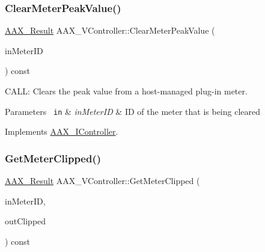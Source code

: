 \subsubsection{\texorpdfstring{ClearMeterPeakValue()}{ClearMeterPeakValue()}}
{\footnotesize\ttfamily \mbox{\hyperlink{a00392_a4d8f69a697df7f70c3a8e9b8ee130d2f}{A\+A\+X\+\_\+\+Result}} A\+A\+X\+\_\+\+V\+Controller\+::\+Clear\+Meter\+Peak\+Value (\begin{DoxyParamCaption}\item[{\mbox{\hyperlink{a00392_ac678f9c1fbcc26315d209f71a147a175}{A\+A\+X\+\_\+\+C\+Type\+ID}}}]{in\+Meter\+ID }\end{DoxyParamCaption}) const\hspace{0.3cm}{\ttfamily [virtual]}}



C\+A\+LL\+: Clears the peak value from a host-\/managed plug-\/in meter. 


\begin{DoxyParams}[1]{Parameters}
\mbox{\texttt{ in}}  & {\em in\+Meter\+ID} & ID of the meter that is being cleared \\
\hline
\end{DoxyParams}


Implements \mbox{\hyperlink{a01789_aa8fe057d2f53109e75662da0a492fa34}{A\+A\+X\+\_\+\+I\+Controller}}.

\mbox{\label{a01905_a2bad61c587f08fc3f99ac297934ad4f9}} 
\subsubsection{\texorpdfstring{GetMeterClipped()}{GetMeterClipped()}}
{\footnotesize\ttfamily \mbox{\hyperlink{a00392_a4d8f69a697df7f70c3a8e9b8ee130d2f}{A\+A\+X\+\_\+\+Result}} A\+A\+X\+\_\+\+V\+Controller\+::\+Get\+Meter\+Clipped (\begin{DoxyParamCaption}\item[{\mbox{\hyperlink{a00392_ac678f9c1fbcc26315d209f71a147a175}{A\+A\+X\+\_\+\+C\+Type\+ID}}}]{in\+Meter\+ID,  }\item[{\mbox{\hyperlink{a00392_aa216506530f1d19a2965931ced2b274b}{A\+A\+X\+\_\+\+C\+Boolean}} $\ast$}]{out\+Clipped }\end{DoxyParamCaption}) const\hspace{0.3cm}{\ttfamily [virtual]}}




